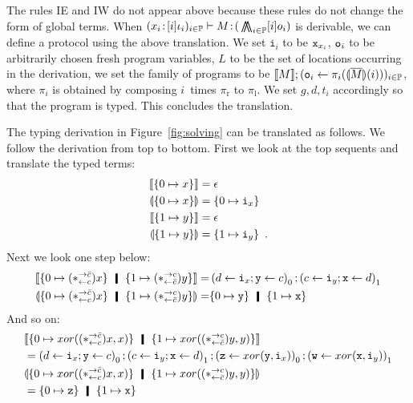 The rules IE and IW do not appear above because these rules do not
change the form of global terms.
When $({x_i} \mathord{\colon\kern -2pt}{[i]\iota_i})_{i\in\mathbb{P}}
\vdash{M} \mathord{\colon\kern -2pt}{(}\operatorname*{\bigwedge\kern -8pt \bigwedge}_{i\in \mathbb{P}}[i]o_i)$ is
derivable,
we can define a protocol using the above translation.
We set $\mathtt i_i$ to be ${\texttt{x}}_{x_i}$, ${\texttt{o}}_i$ to be arbitrarily
chosen fresh program variables, $L$ to be the set of locations
occurring in the derivation, we set the family of programs to be
$\llbracket{M}\rrbracket; ({\texttt{o}}_i\leftarrow \pi_i(\llparenthesis{\overline M}\rrparenthesis(i)))_{i\in\mathbb{P}}$,
where $\pi_i$ is obtained by composing $i$~times $\pi_{\mathrm r}$ to
$\pi_{\mathrm l}$.
We set $g,d,t_i$ accordingly so that the program is typed.
This concludes the translation.
 \begin{example}
  The typing derivation in Figure~\ref{fig:solving} can be translated
  as follows.  We follow the derivation from top to bottom.  First we
  look at the top sequents and translate the typed terms:
  \begin{align*}
   \llbracket{{\{0\mapsto x\}}}\rrbracket&= \epsilon\\
   \llparenthesis{{\{0\mapsto x\}}}\rrparenthesis &=
   \{0\mapsto \texttt{i}_x\} \\
   \llbracket{{\{1\mapsto y\}}}\rrbracket &=
   \epsilon\\
   \llparenthesis{{\{1\mapsto y\}}}\rrparenthesis &=
   \{1\mapsto \texttt{i}_y\}\enspace.
  \end{align*}
  Next we look one step below:
  \begin{align*}
   \semo{{\{0\mapsto (\comodL)x\}} \hmid
   {\{1\mapsto (\comodR)y\}}}
   =&
   \left(d\leftarrow\p i_x; \p y \leftarrow c\right)_0;
   \left(c\leftarrow\p i_y; \p x \leftarrow d\right)_1\\
   \semoi{{\{0\mapsto (\comodL)x\}} \hmid
   {\{1\mapsto (\comodR)y\}}}
   =& \{0\mapsto \p y\}\hmid \{1\mapsto \p x\}\enspace
  \end{align*}
  And so on:
\begin{align*}
 &\semo{{\{0\mapsto xor((\comodL)x,x)\}}\hmid
  {\{1\mapsto xor((\comodR)y,y)\}}}\\
&= \left(d\leftarrow \p i_x; \p y\leftarrow c\right)_0;
 \left(c\leftarrow \p i_y; \p x\leftarrow d\right)_1;
 \left(\p z\leftarrow xor(\p y,\p i_x)\right)_0;
 \left(\p w\leftarrow xor(\p x,\p i_y)\right)_1
 \\
 &\semoi{{\{0\mapsto xor((\comodL)x,x)\}}\hmid
  \{1\mapsto xor((\comodR)y,y)\}} \\
 &= \{0\mapsto \p z\} \hmid \{1\mapsto \p x\}
\end{align*}

\end{example}
